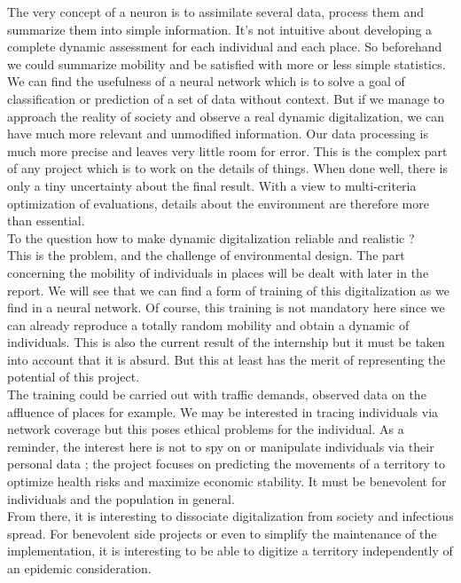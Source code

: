 The very concept of a neuron is to assimilate several data, process them and summarize them into simple information. It's not intuitive about developing a complete dynamic assessment for each individual and each place. So beforehand we could summarize mobility and be satisfied with more or less simple statistics. We can find the usefulness of a neural network which is to solve a goal of classification or prediction of a set of data without context. But if we manage to approach the reality of society and observe a real dynamic digitalization, we can have much more relevant and unmodified information. Our data processing is much more precise and leaves very little room for error. This is the complex part of any project which is to work on the details of things. When done well, there is only a tiny uncertainty about the final result. With a view to multi-criteria optimization of evaluations, details about the environment are therefore more than essential.\\

To the question how to make dynamic digitalization reliable and realistic ?\\

This is the problem, and the challenge of environmental design. The part concerning the mobility of individuals in places will be dealt with later in the report. We will see that we can find a form of training of this digitalization as we find in a neural network. Of course, this training is not mandatory here since we can already reproduce a totally random mobility and obtain a dynamic of individuals. This is also the current result of the internship but it must be taken into account that it is absurd. But this at least has the merit of representing the potential of this project.\\

The training could be carried out with traffic demands, observed data on the affluence of places for example. We may be interested in tracing individuals via network coverage but this poses ethical problems for the individual. As a reminder, the interest here is not to spy on or manipulate individuals via their personal data ; the project focuses on predicting the movements of a territory to optimize health risks and maximize economic stability. It must be benevolent for individuals and the population in general.\\

From there, it is interesting to dissociate digitalization from society and infectious spread. For benevolent side projects or even to simplify the maintenance of the implementation, it is interesting to be able to digitize a territory independently of an epidemic consideration.\\

